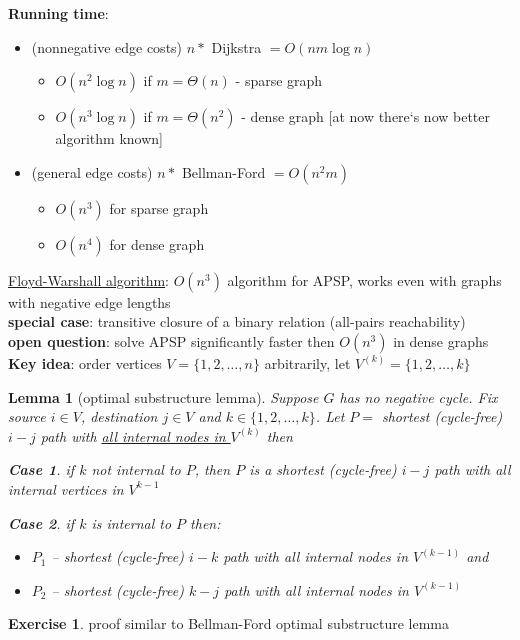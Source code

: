 \documentclass[a4paper,12pt]{article}
\theoremstyle{plain}
\newtheorem*{lemma}{Lemma}
\theoremstyle{definition}
\newtheorem{problem}{Exercise}[section]
\newtheorem{case}{Case}[subsection]
\theoremstyle{remark}
\begin{document}
\textbf{Running time}:
\begin{itemize}
	\item (nonnegative edge costs) $n *$ Dijkstra $= O(nm \log n)$
	\begin{itemize}
		\item $O(n^2 \log n)$ if $m = \Theta(n)$ - sparse graph
		\item $O(n^3 \log n)$ if $m = \Theta(n^2)$ - dense graph [at now there`s now better algorithm known]
	\end{itemize}
	\item (general edge costs) $n *$ Bellman-Ford $= O(n^2 m)$
	\begin{itemize}
		\item $O(n^3)$ for sparse graph
		\item $O(n^4)$ for dense graph
	\end{itemize}
\end{itemize}

\underline{Floyd-Warshall algorithm}: $O(n^3)$ algorithm for APSP, works even with graphs with negative edge lengths
\\

\textbf{special case}: transitive closure of a binary relation (all-pairs reachability)
\\

\textbf{open question}: solve APSP significantly faster then $O(n^3)$ in dense graphs
\\

\textbf{Key idea}: order vertices $V = \{1, 2, \dots, n\}$ arbitrarily, let $V^{(k)} = \{1, 2, \dots, k\}$

\begin{lemma}[optimal substructure lemma] Suppose $G$ has no negative cycle. Fix source $i \in V$, destination $j \in V$ and $k \in \{1, 2, \dots, k\}$. Let $P =$ shortest (cycle-free) $i-j$ path with \underline{all internal nodes in $V^{(k)}$} then
\begin{case}if $k$ not internal to $P$, then $P$ is a shortest (cycle-free) $i-j$ path with all internal vertices in $V^{k-1}$\end{case}
\begin{case}if $k$ is internal to $P$ then:
\begin{itemize}
	\item $P_1$ -- shortest (cycle-free) $i-k$ path with all internal nodes in $V^{(k-1)}$ and
	\item $P_2$ -- shortest (cycle-free) $k-j$ path with all internal nodes in $V^{(k-1)}$
\end{itemize}
\end{case}
\end{lemma}
\begin{problem}proof similar to Bellman-Ford optimal substructure lemma\end{problem}
\end{document}
